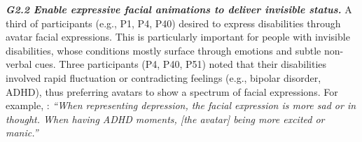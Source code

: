 

\textbf{\textit{G2.2 Enable expressive facial animations to deliver invisible status.}}
A third of participants (e.g., P1, P4, P40) desired to express disabilities through avatar facial expressions. This is particularly important for people with invisible disabilities, whose conditions mostly surface through emotions and subtle non-verbal cues. %
Three participants (P4, P40, P51) noted that their disabilities involved rapid fluctuation or contradicting feelings (e.g., bipolar disorder, ADHD), thus preferring avatars to show a spectrum of facial expressions. For example, : \textit{``When representing depression, the facial expression is more sad or in thought. When having ADHD moments, [the avatar] being more excited or manic.''} 


